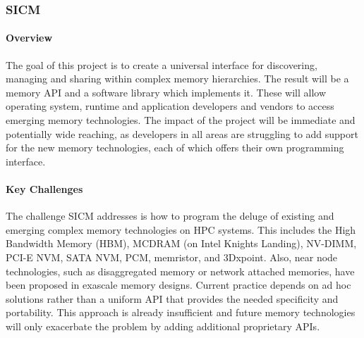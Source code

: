 \subsubsection{ SICM}
\paragraph{Overview} %
The goal of this project is to create a universal interface for discovering, managing and sharing within complex memory hierarchies. The result will be a memory API and a software library which implements it. These will allow operating system, runtime and application developers and vendors to access emerging memory technologies. The impact of the project will be immediate and potentially wide reaching, as developers in all areas are struggling to add support for the new memory technologies, each of which offers their own programming interface. 

\paragraph{Key  Challenges} %
The challenge SICM addresses is how to program the deluge of existing and emerging complex memory technologies on HPC systems. This includes the High Bandwidth Memory (HBM), MCDRAM (on Intel Knights Landing), NV-DIMM, PCI-E NVM, SATA NVM, PCM, memristor, and 3Dxpoint. Also, near node technologies, such as disaggregated memory or network attached memories, have been proposed in exascale memory designs. Current practice depends on ad hoc solutions rather than a uniform API that provides the needed specificity and portability. This approach is already insufficient and future memory technologies will only exacerbate the problem by adding additional proprietary APIs. 

